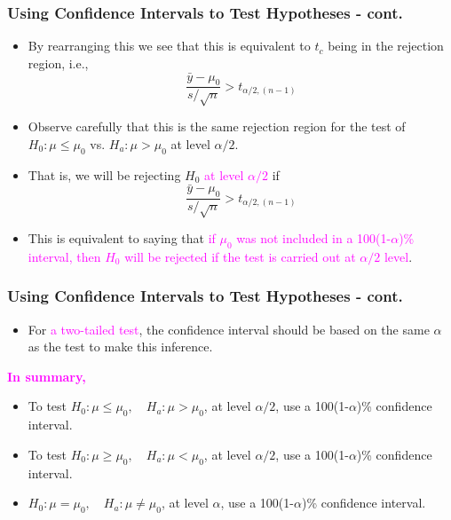 \documentclass[xcolor=dvipsnames,12pt]{beamer}
\begin{document}
\begin{frame}
\frametitle{Using Confidence  Intervals to Test Hypotheses - cont.}
\begin{itemize}
\item By rearranging this we see that this is equivalent to $t_c$ being in the rejection
region, i.e.,\\
$$\frac{\bar{y}-\mu_0}{s/\sqrt{n}} > t_{\alpha/2,(n-1)}$$
\item Observe carefully that this is the same rejection region for
 the test of $H_0: \mu \leq  \mu_0$ vs. $H_a: \mu >
\mu_0$ at level  $\alpha/2$. 
\item That is, we will be rejecting $H_0$ \textcolor{magenta}{ at level  $\alpha/2$} if \\
$$\frac{\bar{y}-\mu_0}{s/\sqrt{n}} > t_{\alpha/2,(n-1)}$$
\item This is equivalent to saying that \textcolor{magenta}{if $\mu_0$ was not
included in a 100(1-$\alpha$)\% interval, then  $H_0$ 
will  be rejected if the test is  carried out at $\alpha/2$ level}.
\end{itemize}
\end{frame}


\begin{frame}
\frametitle{Using Confidence  Intervals to Test Hypotheses - cont.}
\begin{itemize}
\item  For \textcolor{magenta}{ a two-tailed test}, the confidence interval should be based on the same
$\alpha$ as the test to make this inference.
\end{itemize}
\textcolor{magenta}{\textbf{In summary,}}
\begin{itemize}
\item To test $H_0: \mu \leq \mu_0, \quad H_a: \mu > \mu_0$, at
level  $\alpha/2$, use a  100(1-$\alpha$)\% confidence interval.
\item To test $H_0: \mu \geq \mu_0, \quad H_a: \mu < \mu_0$, 
at level  $\alpha/2$, use a  100(1-$\alpha$)\% confidence interval.    
\item $H_0: \mu = \mu_0, \quad H_a: \mu \neq \mu_0$, 
at level  $\alpha$, use a  100(1-$\alpha$)\% confidence interval.   
\end{itemize}
\end{frame}
\end{document}
